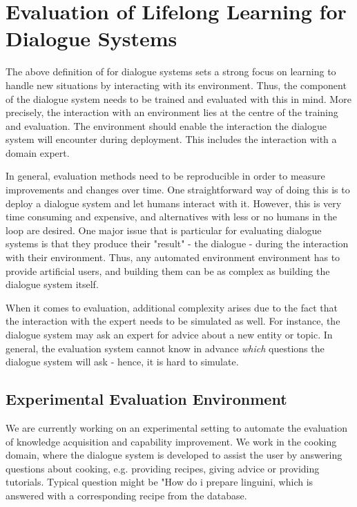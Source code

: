 \documentclass{lihlith}
\theoremstyle{definition}
\theoremstyle{remark}
\begin{document}
\section{Evaluation of Lifelong Learning for Dialogue Systems}
\label{sec:evaluation}
The above definition of \LLL for dialogue systems sets a strong focus on learning to handle new situations by interacting with its environment. Thus, the \LLL component of the dialogue system needs to be trained and evaluated with this in mind. More precisely, the interaction with an environment lies at the centre of the training and evaluation. The environment should enable the interaction the dialogue system will encounter during deployment. This includes the interaction with a domain expert. 

In general, \LLL evaluation methods need to be reproducible in order to measure improvements and changes over time. One straightforward way of doing this is to deploy a dialogue system and let humans interact with it. However, this is very time consuming and expensive, and alternatives with less or no humans in the loop are desired. 
One major issue that is particular for evaluating dialogue systems is that they produce their "result" - the dialogue - during the interaction with their environment. Thus, any automated environment environment has to provide artificial users, and building them can be as complex as building the dialogue system itself. 

When it comes to \LLL evaluation, additional complexity arises due to the fact that the interaction with the expert needs to be simulated as well. For instance, the dialogue system may ask an expert for advice about a new entity or topic. In general, the evaluation system cannot know in advance \emph{which} questions the dialogue system will ask - hence, it is hard to simulate. 

\subsection*{Experimental Evaluation Environment} We are currently working on an experimental setting to automate the evaluation of knowledge acquisition and capability improvement. We work in the cooking domain, where the dialogue system is developed to assist the user by answering questions about cooking, e.g. providing recipes, giving advice or providing tutorials. Typical question might be "How do i prepare linguini, which is answered with a corresponding recipe from the database. 
\end{document}
